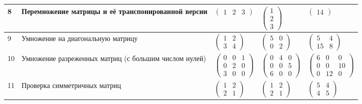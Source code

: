 \begin{table}[H]
\begin{center}
{\begin{tabular}{|x{1cm}|x{6cm}|x{3.5cm}|x{2.5cm}|x{4cm}|}
				8
				& Перемножение матрицы и её транспонированной версии
				& $\begin{pmatrix}
					1 & 2 & 3
				\end{pmatrix}$
				& $\begin{pmatrix}
					1\\
					2\\
					3
				\end{pmatrix}$
				& $\begin{pmatrix}
					14
				\end{pmatrix}$
				\\ \hline
				
				9
				& Умножение на диагональную матрицу
				& $\begin{pmatrix}
					1 & 2\\
					3 & 4
				\end{pmatrix}$
				& $\begin{pmatrix}
					5 & 0\\
					0 & 2
				\end{pmatrix}$
				& $\begin{pmatrix}
					5 & 4\\
					15 & 8
				\end{pmatrix}$
				\\ \hline
				
				10
				& Умножение разреженных матриц (с большим числом нулей)
				& $\begin{pmatrix}
					0 & 0 & 1\\
					0 & 2 & 0\\
					3 & 0 & 0
				\end{pmatrix}$
				& $\begin{pmatrix}
					0 & 4 & 0\\
					0 & 0 & 5\\
					6 & 0 & 0
				\end{pmatrix}$
				& $\begin{pmatrix}
					6 & 0 & 0\\
					0 & 0 & 10\\
					0 & 12 & 0
				\end{pmatrix}$
				\\ \hline
				
				11
				& Проверка симметричных матриц
				& $\begin{pmatrix}
					1 & 2\\
					2 & 1
				\end{pmatrix}$
				& $\begin{pmatrix}
					1 & 2\\
					2 & 1
				\end{pmatrix}$
				& $\begin{pmatrix}
					5 & 4\\
					4 & 5
				\end{pmatrix}$
				\\ \hline
				

\end{tabular}}
\end{center}
\end{table}
